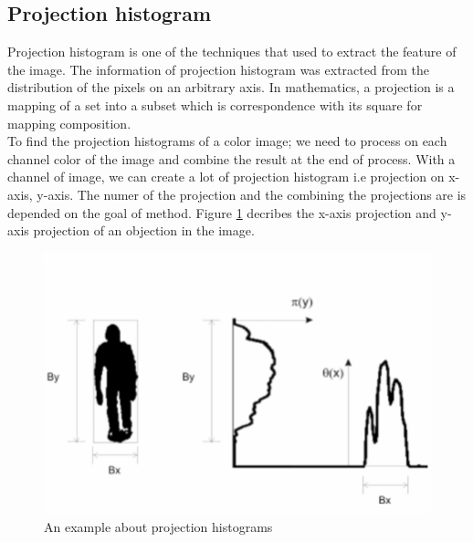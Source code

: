 \subsection{Projection histogram}
Projection histogram is one of the techniques that used to extract the feature of the image. The information of projection histogram was extracted from the distribution of the pixels on an arbitrary axis. In mathematics, a projection is a mapping of a set into a subset which is correspondence with its square for mapping composition. \\[0.2cm]
To find the projection histograms of a color image; we need to process on each channel color of the image and combine the result at the end of process. With a channel of image, we can create a lot of projection histogram i.e projection on x-axis, y-axis. The numer of the projection and the combining the projections are is depended on the goal of method. Figure \ref{fignprojection} decribes the x-axis projection and y-axis projection of an objection in the image.
\begin{figure}[h]
	\centering
	\includegraphics[scale=0.4]{images/projection}
	\caption{An example about projection histograms}
	\label{fignprojection}
\end{figure}

